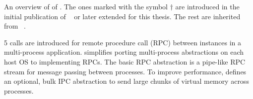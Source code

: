 \begin{table}[htp!]
\centering

\caption{An overview of \thehostabi{} of \graphene{}. The ones marked with the symbol $\dagger$ are introduced in the initial publication of \graphene{}~\cite{tsai14graphene} or later extended for this thesis. The rest are inherited from \drawbridge{}~\cite{porter11drawbridge}.}
\label{tab:overview:abi}
\end{table}




5 calls are introduced for 
remote procedure call (RPC) between \libos{} instances
in a multi-process application.
\graphene{} simplifies porting multi-process abstractions
on each host OS
to implementing RPCs.
The basic RPC abstraction is 
a pipe-like RPC stream for message passing between processes.
To improve performance,
\thehostabi{} defines an optional, bulk IPC abstraction
to send large chunks of virtual memory
across processes.





